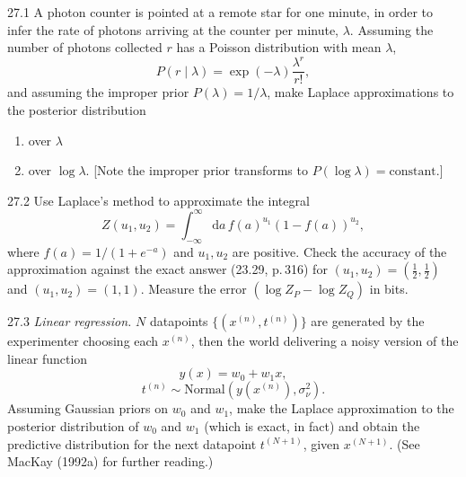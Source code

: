 \documentclass[12pt, a4paper]{article}
\begin{document}
\begin{prob}{27.1}
A photon counter is pointed at a remote star for one minute, in order to infer the rate of photons arriving at the counter per minute, $\lambda$. Assuming the number of photons collected $r$ has a Poisson distribution with mean $\lambda$,
\[
P(r \mid \lambda) = \exp(-\lambda)\frac{\lambda^r}{r!},
\]
and assuming the improper prior $P(\lambda) = 1/\lambda$, make Laplace approximations to the posterior distribution
\begin{enumerate}[label=(\alph*)]
    \item over $\lambda$
    \item over $\log \lambda$. [Note the improper prior transforms to $P(\log \lambda) = \text{constant}$.]
\end{enumerate}
\end{prob}
\begin{sol}
\end{sol}
\bigskip

\begin{prob}{27.2}
Use Laplace's method to approximate the integral
\[
Z(u_1, u_2) = \int_{-\infty}^{\infty} \mathrm{d}a \, f(a)^{u_1} \left(1 - f(a)\right)^{u_2},
\]
where $f(a) = 1/(1 + e^{-a})$ and $u_1, u_2$ are positive. Check the accuracy of the approximation against the exact answer (23.29, p.\,316) for $(u_1, u_2) = (\tfrac{1}{2}, \tfrac{1}{2})$ and $(u_1, u_2) = (1, 1)$. Measure the error $(\log Z_P - \log Z_Q)$ in bits.
\end{prob}
\begin{sol}
\end{sol}
\bigskip

\begin{prob}{27.3}
\emph{Linear regression.} $N$ datapoints $\{(x^{(n)}, t^{(n)})\}$ are generated by the experimenter choosing each $x^{(n)}$, then the world delivering a noisy version of the linear function
\[
y(x) = w_0 + w_1 x,
\]
\[
t^{(n)} \sim \text{Normal}\left(y(x^{(n)}), \sigma_\nu^2\right).
\]
Assuming Gaussian priors on $w_0$ and $w_1$, make the Laplace approximation to the posterior distribution of $w_0$ and $w_1$ (which is exact, in fact) and obtain the predictive distribution for the next datapoint $t^{(N+1)}$, given $x^{(N+1)}$. (See MacKay (1992a) for further reading.)
\end{prob}
\begin{sol}
\end{sol}
\bigskip
\end{document}
